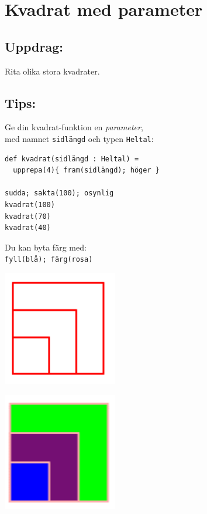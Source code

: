 \chapter{Kvadrat med parameter}
\begin{multicols}{2}
\section*{\color{BrickRed}Uppdrag:}
Rita olika stora kvadrater.
\section*{\color{OliveGreen}Tips:}
Ge din kvadrat-funktion en {\it parameter},\\
med namnet \lstinline{sidlängd} och typen \lstinline{Heltal}:

\begin{lstlisting}[basicstyle={\ttfamily\fontsize{16}{19}\selectfont},numbers=none]
def kvadrat(sidlängd : Heltal) = 
  upprepa(4){ fram(sidlängd); höger }

sudda; sakta(100); osynlig
kvadrat(100) 
kvadrat(70)
kvadrat(40)
\end{lstlisting}
        
Du kan byta färg med:\\
\lstinline{fyll(blå); färg(rosa)}


\columnbreak


\begin{center}
\includegraphics[width=5.0cm]{../img/square-param.png}
\end{center}

\begin{center}
\includegraphics[width=5.0cm]{../img/square-param-color.png}
\end{center}

\end{multicols}

